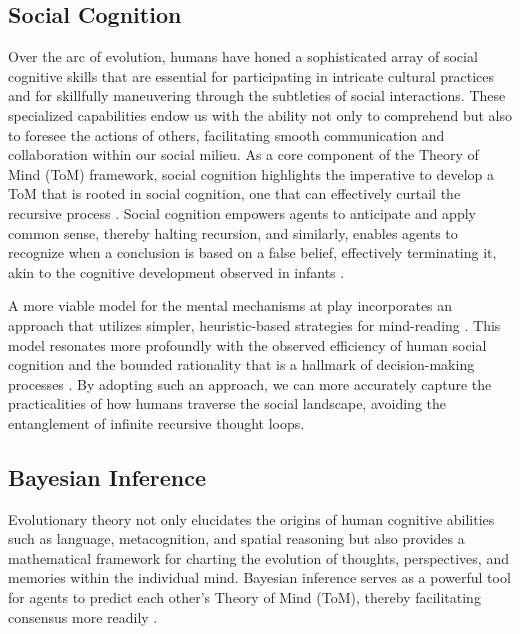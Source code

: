 \documentclass{article}
\begin{document}
\subsection{Social Cognition}

Over the arc of evolution, humans have honed a sophisticated array of social cognitive skills that are essential for participating in intricate cultural practices and for skillfully maneuvering through the subtleties of social interactions. These specialized capabilities endow us with the ability not only to comprehend but also to foresee the actions of others, facilitating smooth communication and collaboration within our social milieu. As a core component of the Theory of Mind (ToM) framework, social cognition highlights the imperative to develop a ToM that is rooted in social cognition, one that can effectively curtail the recursive process \citep{herrmann2007humans}. Social cognition empowers agents to anticipate and apply common sense, thereby halting recursion, and similarly, enables agents to recognize when a conclusion is based on a false belief, effectively terminating it, akin to the cognitive development observed in infants \citep{houde2022cambridge}.

A more viable model for the mental mechanisms at play incorporates an approach that utilizes simpler, heuristic-based strategies for mind-reading \citep{murphy2009beyond}. This model resonates more profoundly with the observed efficiency of human social cognition and the bounded rationality that is a hallmark of decision-making processes \citep{Simon1997}. By adopting such an approach, we can more accurately capture the practicalities of how humans traverse the social landscape, avoiding the entanglement of infinite recursive thought loops.

\subsection{Bayesian Inference}
Evolutionary theory not only elucidates the origins of human cognitive abilities such as language, metacognition, and spatial reasoning but also provides a mathematical framework for charting the evolution of thoughts, perspectives, and memories within the individual mind. Bayesian inference serves as a powerful tool for agents to predict each other's Theory of Mind (ToM), thereby facilitating consensus more readily \citep{suchow2017evolution}.
\end{document}
